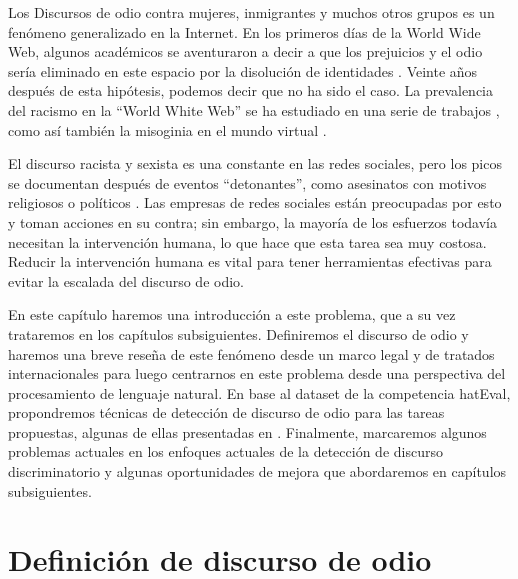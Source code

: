 \label{chap:04_hate_speech}
\newcommand{\mr}[2]{\multirow{#1}{*}{#2}}
\newcommand{\mc}[2]{\multicolumn{#1}{c}{#2}}

Los Discursos de odio contra mujeres, inmigrantes y muchos otros grupos es un fenómeno generalizado en la Internet. En los primeros días de la World Wide Web, algunos académicos se aventuraron a decir a que los prejuicios y el odio sería eliminado en este espacio por la disolución de identidades \cite{levy2001cyberculture, rheingold1993virtual}. Veinte años después de esta hipótesis, podemos
decir que no ha sido el caso. La prevalencia del racismo en la ``World White Web'' se ha estudiado en una serie de trabajos \cite{adams2005white, kettrey2014staking}, como así también la misoginia en el mundo virtual \cite{filipovic2007blogging, mantilla2013gendertrolling}.

El discurso racista y sexista es una constante en las redes sociales, pero los picos se documentan después de eventos ``detonantes'', como asesinatos con motivos religiosos o políticos \cite{burnap2015cyber}. Las empresas de redes sociales están preocupadas por esto y toman acciones en su contra; sin embargo, la mayoría de los esfuerzos todavía necesitan la intervención humana, lo que hace que esta tarea sea muy costosa. Reducir la intervención humana es vital para tener herramientas efectivas para evitar la escalada del discurso de odio.


En este capítulo haremos una introducción a este problema, que a su vez trataremos en los capítulos subsiguientes. Definiremos el discurso de odio y haremos una breve reseña de este fenómeno desde un marco legal y de tratados internacionales para luego centrarnos en este problema desde una perspectiva del procesamiento de lenguaje natural. En base al dataset de la competencia hatEval\cite{hateval2019semeval}, propondremos técnicas de detección de discurso de odio para las tareas propuestas, algunas de ellas presentadas en \citet{atalaya_tass2018}. Finalmente, marcaremos algunos problemas actuales en los enfoques actuales de la detección de discurso discriminatorio y algunas oportunidades de mejora que abordaremos en capítulos subsiguientes.


\section{Definición de discurso de odio}
\label{sec:hate_speech_definitions}



